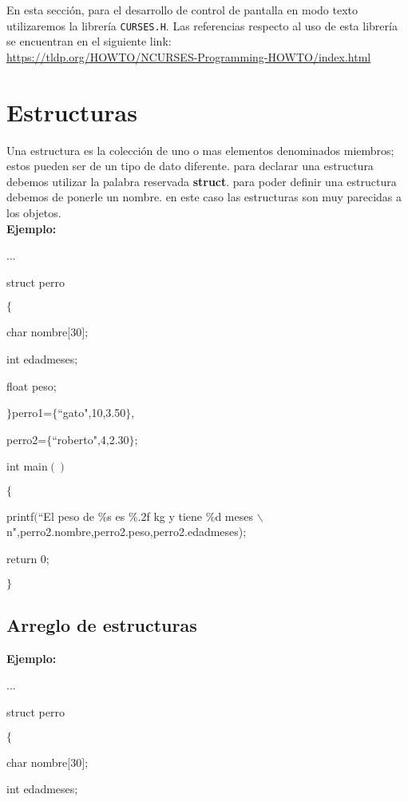 \documentclass[]{article}
\begin{document}
	En esta sección, para el desarrollo de control de pantalla en modo texto utilizaremos la librería \texttt{CURSES.H}. Las referencias respecto al uso de esta librería se encuentran en el siguiente link:\\
	
	\url{https://tldp.org/HOWTO/NCURSES-Programming-HOWTO/index.html}
	
		
	\section{Estructuras}
	
	Una estructura es la colección de uno o mas elementos denominados miembros; estos pueden ser de un tipo de dato diferente. para declarar una estructura debemos utilizar la palabra reservada \textbf{struct}. para poder definir una estructura debemos de ponerle un nombre. en este caso las estructuras son muy parecidas a los objetos.\\
	
	\textbf{Ejemplo:\\}
	
	...
	
	struct perro
	
	$\lbrace$
	
	char nombre$[$30$]$;
	
	int edadmeses;
	
	float peso;
	
	$\rbrace$perro1=$\lbrace$``gato",10,3.50$\rbrace$,
	
	perro2=$\lbrace$``roberto",4,2.30$\rbrace$;
	
	int main$()$
	
	$\lbrace$
	
	printf$($``El peso de \%s es \%.2f kg y tiene \%d meses $\backslash$n",perro2.nombre,perro2.peso,perro2.edadmeses);
	
	return 0;
	
	$\rbrace$
	
	\subsection{Arreglo de estructuras}
	
	\textbf{Ejemplo:\\}
	
	...
	
	struct perro
	
	$\lbrace$
	
	char nombre$[$30$]$;
	
	int edadmeses;
	
\end{document}
